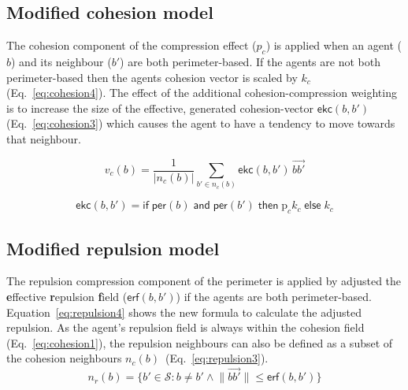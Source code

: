 \documentclass[12pt,a4paper]{IEEEtran}
\begin{document}
\subsection{Modified cohesion model}
The cohesion component of the compression effect ($p_c$) is applied when an agent ($b$) and its neighbour ($b'$) are both perimeter-based. If the agents are not both perimeter-based then the agents cohesion vector is scaled by $k_c$ (Eq.~\ref{eq:cohesion4}). The effect of the additional cohesion-compression weighting is to increase the size of the effective, generated cohesion-vector $\mathsf{ekc}(b,b')$ (Eq.~\ref{eq:cohesion3}) which causes the agent to have a tendency to move towards that neighbour. 

\begin{equation}\label{eq:cohesion3}
v_c(b) = \frac{1}{\lvert n_c(b)\rvert} \sum_{b' \in n_c(b)}\mathsf{ekc}(b, b')\, \vec{bb'}
\end{equation}

\small
\begin{equation}\label{eq:cohesion4}
\mathsf{ekc}(b, b') = \mathsf{if} \; \mathsf{per}(b) \; \mathsf{and} \; \mathsf{per}(b') \; \mathsf{then} \; \mathrm{p}_ck_c \; \mathsf{else} \; k_c
\end{equation}
\normalsize

\subsection{Modified repulsion model}\label{repulsion:compression}
The repulsion compression component of the perimeter is applied by adjusted the \textbf{e}ffective \textbf{r}epulsion \textbf{f}ield ($\mathsf{erf}(b,b')$) if the agents are both perimeter-based. Equation~\ref{eq:repulsion4} shows the new formula to calculate the adjusted repulsion. As the agent's repulsion field is always within the cohesion field (Eq.~\ref{eq:cohesion1}), the repulsion neighbours can also be defined as a subset of the cohesion neighbours $n_c(b)$~(Eq.~\ref{eq:repulsion3}).\\

\begin{equation}\label{eq:repulsion1}
n_r(b) = \{b' \in \mathcal{S} : b \neq b' \land \lVert\vec{bb'}\rVert \leq \mathsf{erf}(b,b')\}
\end{equation}

\normalsize
\end{document}
